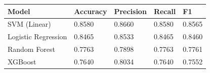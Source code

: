 \begin{tabular}{lllll}
\toprule
Model & Accuracy & Precision & Recall & F1 \\
\midrule
SVM (Linear) & 0.8580 & 0.8660 & 0.8580 & 0.8565 \\
Logistic Regression & 0.8465 & 0.8533 & 0.8465 & 0.8460 \\
Random Forest & 0.7763 & 0.7898 & 0.7763 & 0.7761 \\
XGBoost & 0.7640 & 0.8034 & 0.7640 & 0.7552 \\
\bottomrule
\end{tabular}
